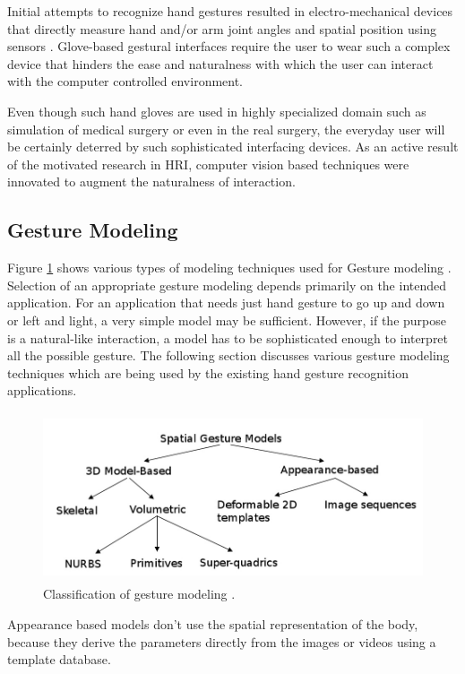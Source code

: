 Initial attempts to recognize hand gestures resulted in electro-mechanical devices that directly measure hand and/or arm joint angles and spatial position using sensors \cite{3}. Glove-based gestural interfaces require the user to wear such a complex device that hinders the ease and naturalness with which the user can interact with the computer controlled environment. 

Even though such hand gloves are used in highly specialized domain such as simulation of medical surgery or even in the real surgery, the everyday user will be certainly deterred by such sophisticated interfacing devices. As an active result of the motivated research in HRI, computer vision based techniques were innovated to augment the naturalness of interaction.

\subsection{Gesture Modeling} Figure \ref{fig:ges:model} shows various types of modeling techniques used for Gesture modeling \cite{3}. Selection of an appropriate gesture modeling depends primarily on the intended application. For an application that needs just hand gesture to go up and down or left and light, a very simple model may be sufficient. However, if the purpose is a natural-like interaction, a model has to be sophisticated enough to interpret all the possible gesture. The following section discusses various gesture modeling techniques which are being used by the existing hand gesture recognition applications. 

\begin{figure}
	[h] \centering 
	\includegraphics[height=5cm]{figures/ges-model.png} 
	\caption{Classification of gesture modeling \cite{10}.}
	\label{fig:ges:model} 
\end{figure}

Appearance based models don't use the spatial representation of the body, because they derive the parameters directly from the images or videos using a template database. 

